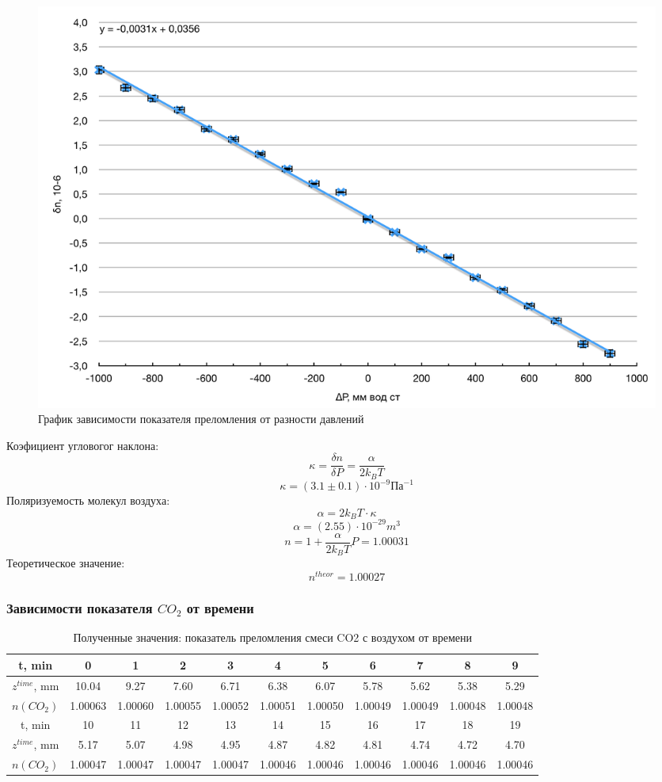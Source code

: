 \documentclass[a4paper, 12pt]{article}
\begin{document}
\begin{figure}[H]
	\centering
	\includegraphics[width = 16 cm]{3.png}
	\caption{График зависимости показателя преломления от разности давлений}
\end{figure}

\noindent Коэфициент угловогог наклона:
\[\kappa = \frac{\delta n}{\delta P} = \frac{\alpha}{2k_BT} \]
\[\kappa = (3.1\pm0.1)\cdot10^{-9} \text{Па}^{-1}\]
\noindent Поляризуемость молекул воздуха:
\[\alpha = 2k_BT\cdot\kappa\]
\[\alpha = (2.55)\cdot10^{-29}m^3\]
\[n=1+\frac{\alpha}{2k_{B}T}P = 1.00031 \]
\noindent Теоретическое значение:
\[n^{theor}=1.00027\]

\newpage
\subsubsection*{Зависимости показателя $CO_2$ от времени}

\begin{table}[H]
	\centering
	\begin{tabular}{|c|c|c|c|c|c|c|c|c|c|c|}
		\hline	
		
	t, min&0&1&2&3&4&5&6&7&8&9\\ \hline
	$z^{time}$, mm&10.04&9.27&7.60&6.71&6.38&6.07&5.78&5.62&5.38&5.29\\ \hline
	$n(CO_2)$&1.00063&1.00060&1.00055&1.00052&1.00051&1.00050&1.00049&1.00049&1.00048&1.00048\\ \hline
	t, min&10&11&12&13&14&15&16&17&18&19\\ \hline
	$z^{time}$, mm&5.17&5.07&4.98&4.95&4.87&4.82&4.81&4.74&4.72&4.70\\ \hline
	$n(CO_2)$&1.00047&1.00047&1.00047&1.00047&1.00046&1.00046&1.00046&1.00046&1.00046&1.00046\\ \hline
	
		
	\end{tabular}	
	\caption{Полученные значения: показатель преломления смеси CO2 с воздухом  от времени}
\end{table}
\end{document}
